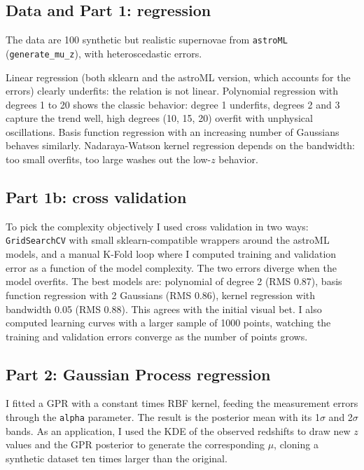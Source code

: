 \documentclass[11pt]{article}
\begin{document}
\subsection*{Data and Part 1: regression}

The data are 100 synthetic but realistic supernovae from \texttt{astroML} (\texttt{generate\_mu\_z}), with heteroscedastic errors.

Linear regression (both sklearn and the astroML version, which accounts for the errors) clearly underfits: the relation is not linear. Polynomial regression with degrees 1 to 20 shows the classic behavior: degree 1 underfits, degrees 2 and 3 capture the trend well, high degrees (10, 15, 20) overfit with unphysical oscillations. Basis function regression with an increasing number of Gaussians behaves similarly. Nadaraya-Watson kernel regression depends on the bandwidth: too small overfits, too large washes out the low-$z$ behavior.

\subsection*{Part 1b: cross validation}

To pick the complexity objectively I used cross validation in two ways: \texttt{GridSearchCV} with small sklearn-compatible wrappers around the astroML models, and a manual K-Fold loop where I computed training and validation error as a function of the model complexity. The two errors diverge when the model overfits. The best models are: polynomial of degree 2 (RMS 0.87), basis function regression with 2 Gaussians (RMS 0.86), kernel regression with bandwidth 0.05 (RMS 0.88). This agrees with the initial visual bet. I also computed learning curves with a larger sample of 1000 points, watching the training and validation errors converge as the number of points grows.

\subsection*{Part 2: Gaussian Process regression}

I fitted a GPR with a constant times RBF kernel, feeding the measurement errors through the \texttt{alpha} parameter. The result is the posterior mean with its 1$\sigma$ and 2$\sigma$ bands. As an application, I used the KDE of the observed redshifts to draw new $z$ values and the GPR posterior to generate the corresponding $\mu$, cloning a synthetic dataset ten times larger than the original.
\end{document}
